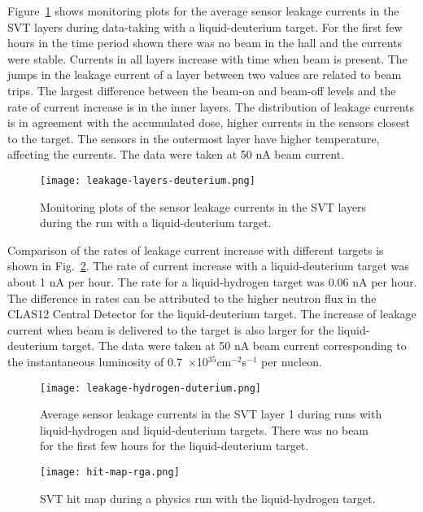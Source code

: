 Figure~\ref{fig:leakage-layers-deuterium} shows monitoring plots for the average sensor leakage currents in the SVT layers during data-taking with a liquid-deuterium target. For the first few hours in the time period shown there was no beam in the hall and the currents were stable. Currents in all layers increase with time when beam is present. The jumps in the leakage current of a layer between two values are related to beam trips. The largest difference between the beam-on and beam-off levels and the rate of current increase is in the inner layers. The distribution of leakage currents is in agreement with the accumulated dose, higher currents in the sensors closest to the target. The sensors in the outermost layer have higher temperature, affecting the currents. The data were taken at 50 nA beam current. 

\begin{figure}[hbt] 
\centering 
\texttt{[image: leakage-layers-deuterium.png]}
\caption{Monitoring plots of the sensor leakage currents in the SVT layers during the run with a liquid-deuterium target.}
\label{fig:leakage-layers-deuterium}
\end{figure}

Comparison of the rates of leakage current increase with different targets is shown in Fig.~\ref{fig:leakage-hydrogen-duterium}. The rate of current increase with a liquid-deuterium target was about 1 nA per hour. The rate for a liquid-hydrogen target was 0.06 nA per hour. The difference in rates can be attributed to the higher neutron flux in the CLAS12 Central Detector for the liquid-deuterium target. The increase of leakage current when beam is delivered to the target is also larger for the liquid-deuterium target. The data were taken at 50 nA beam current corresponding to the instantaneous luminosity of 0.7~$\times$10$^{35}$cm$^{-2}$s$^{-1}$ per nucleon.

\begin{figure}[hbt] 
\centering 
\texttt{[image: leakage-hydrogen-duterium.png]}
\caption{Average sensor leakage currents in the SVT layer 1 during runs with liquid-hydrogen and liquid-deuterium targets. There was no beam for the first few hours for the liquid-deuterium target.}
\label{fig:leakage-hydrogen-duterium}
\end{figure}

\begin{figure}[hbt] 
\centering 
\texttt{[image: hit-map-rga.png]}
\caption{SVT hit map during a physics run with the liquid-hydrogen target.}
\label{fig:hit-map-rga}
\end{figure}

